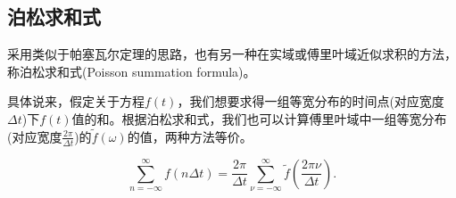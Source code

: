 \subsection{泊松求和式}
\label{sec:fourier-poisson-summation-formula}
采用类似于帕塞瓦尔定理的思路，也有另一种在实域或傅里叶域近似求积的方法，称泊松求和式(Poisson summation formula)。
\begin{theorem}
  具体说来，假定关于方程$f(t)$，我们想要求得一组等宽分布的时间点(对应宽度$\Delta t$)下$f(t)$值的和。根据泊松求和式，我们也可以计算傅里叶域中一组等宽分布(对应宽度$\frac{2 \pi}{\Delta t}$)的$\tilde{f}\left( \omega \right)$的值，两种方法等价。

  \begin{equation}
    \label{eq:fourier-poisson-summation-formula}
    \sum_{n = - \infty}^{\infty} f \left( n \Delta t \right)
    =
    \frac{2 \pi}{\Delta t}  \sum_{\nu = - \infty}^{\infty}
    \tilde{f} \left( \frac{2 \pi \nu}{\Delta t} \right).
  \end{equation}
\end{theorem}
